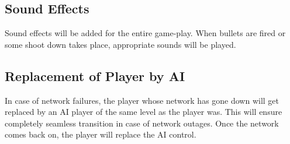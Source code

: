 \documentclass{article}
\begin{document}
		\subsection{Sound Effects}
			Sound effects will be added for the entire game-play. When bullets are fired or some shoot down takes place, appropriate sounds will be played.
		\subsection{Replacement of Player by AI}
			In case of network failures, the player whose network has gone down will get replaced by an AI player of the same level as the player was. This will ensure completely seamless transition in case of network outages. Once the network comes back on, the player will replace the AI control. 
\end{document}
